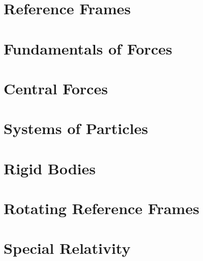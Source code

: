 \documentclass[british,11pt,a4paper]{report}
\begin{document}
\maketitle
\tableofcontents
\chapter{Reference Frames}
\label{chapRefFrames}

\chapter{Fundamentals of Forces}
\label{chapForces}

\chapter{Central Forces}
\label{chapCentralForces}

\chapter{Systems of Particles}
\label{chapSystems}

\chapter{Rigid Bodies}
\label{chapRigidBodies}

\chapter{Rotating Reference Frames}
\label{chapRotatingFrames}

\chapter{Special Relativity}
\label{chapSpecialRelativity}

\end{document}
